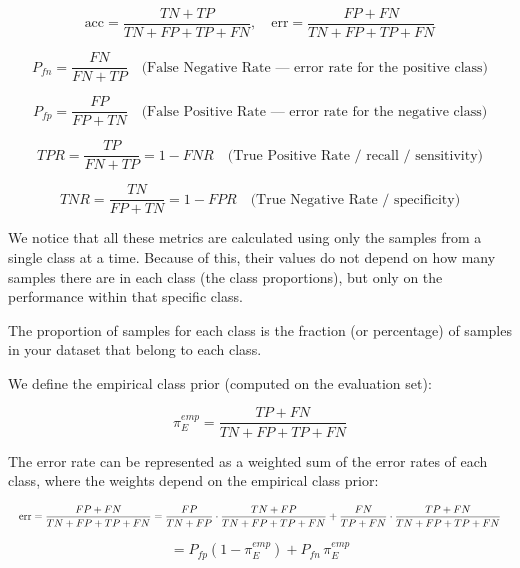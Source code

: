 \begin{equation*}
\text{acc} = \frac{TN + TP}{TN + FP + TP + FN}, \quad \text{err} = \frac{FP + FN}{TN + FP + TP + FN}
\end{equation*}

\begin{equation*}
P_{fn} = \frac{FN}{FN + TP} \quad \text{(False Negative Rate --- error rate for the positive class)}
\end{equation*}

\begin{equation*}
P_{fp} = \frac{FP}{FP + TN} \quad \text{(False Positive Rate --- error rate for the negative class)}
\end{equation*}

\begin{equation*}
TPR = \frac{TP}{FN + TP} = 1 - FNR \quad \text{(True Positive Rate / recall / sensitivity)}
\end{equation*}

\begin{equation*}
TNR = \frac{TN}{FP + TN} = 1 - FPR \quad \text{(True Negative Rate / specificity)}
\end{equation*}

We notice that all these metrics are calculated using only the samples from a single class at a time. Because of this, their values do not depend on how many samples there are in each class (the class proportions), but only on the performance within that specific class.

The proportion of samples for each class is the fraction (or percentage) of samples in your dataset that belong to each class.

We define the empirical class prior (computed on the evaluation set):

\begin{equation*}
\pi^{emp}_E = \frac{TP + FN}{TN + FP + TP + FN}
\end{equation*}

The error rate can be represented as a weighted sum of the error rates of each class, where the weights depend on the empirical class prior:

\begin{equation*}
\resizebox{\textwidth}{!}{$\displaystyle
\text{err} = \frac{FP + FN}{TN + FP + TP + FN} = \frac{FP}{TN + FP} \cdot \frac{TN + FP}{TN + FP + TP + FN} + \frac{FN}{TP + FN} \cdot \frac{TP + FN}{TN + FP + TP + FN}
$}
\end{equation*}

\begin{equation*}
= P_{fp}(1 - \pi^{emp}_E) + P_{fn}\,\pi^{emp}_E
\end{equation*}

